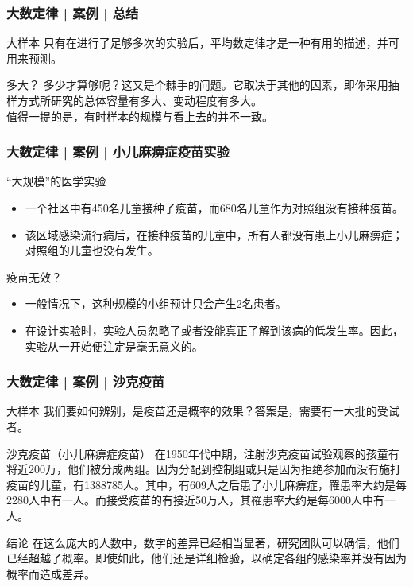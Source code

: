 \begin{frame}
  \frametitle{大数定律 | 案例 | 总结}
  \begin{block}{大样本}
    只有在进行了足够多次的实验后，平均数定律才是一种有用的描述，并可用来预测。
  \end{block}
  \pause
  \begin{block}{多大？}
    多少才算够呢？这又是个棘手的问题。它取决于其他的因素，即你采用抽样方式所研究的总体容量有多大、变动程度有多大。\\
    \vspace{0.5em}
    值得一提的是，有时样本的规模与看上去的并不一致。
  \end{block}
\end{frame}

\begin{frame}
  \frametitle{大数定律 | 案例 | 小儿麻痹症疫苗实验}
  \begin{block}{“大规模”的医学实验}
    \begin{itemize}
      \item 一个社区中有450名儿童接种了疫苗，而680名儿童作为对照组没有接种疫苗。
      \item 该区域感染流行病后，在接种疫苗的儿童中，所有人都没有患上小儿麻痹症；对照组的儿童也没有发生。
    \end{itemize}
  \end{block}
  \pause \pause \pause \pause
  \begin{block}{疫苗无效？}
    \begin{itemize}
      \item 一般情况下，这种规模的小组预计只会产生2名患者。
      \item 在设计实验时，实验人员忽略了或者没能真正了解到该病的低发生率。因此，实验从一开始便注定是毫无意义的。
    \end{itemize}
  \end{block}
\end{frame}

\begin{frame}
  \frametitle{大数定律 | 案例 | 沙克疫苗}
  \begin{block}{大样本}
    我们要如何辨别，是疫苗还是概率的效果？答案是，需要有一大批的受试者。
  \end{block}
  \pause
  \begin{block}{沙克疫苗（小儿麻痹症疫苗）}
    在1950年代中期，注射沙克疫苗试验观察的孩童有将近200万，他们被分成两组。因为分配到控制组或只是因为拒绝参加而没有施打疫苗的儿童，有1388785人。其中，有609人之后患了小儿麻痹症，罹患率大约是每2280人中有一人。而接受疫苗的有接近50万人，其罹患率大约是每6000人中有一人。
  \end{block}
  \pause
  \begin{block}{结论}
    在这么庞大的人数中，数字的差异已经相当显著，研究团队可以确信，他们已经超越了概率。即使如此，他们还是详细检验，以确定各组的感染率并没有因为概率而造成差异。
  \end{block}
\end{frame}

